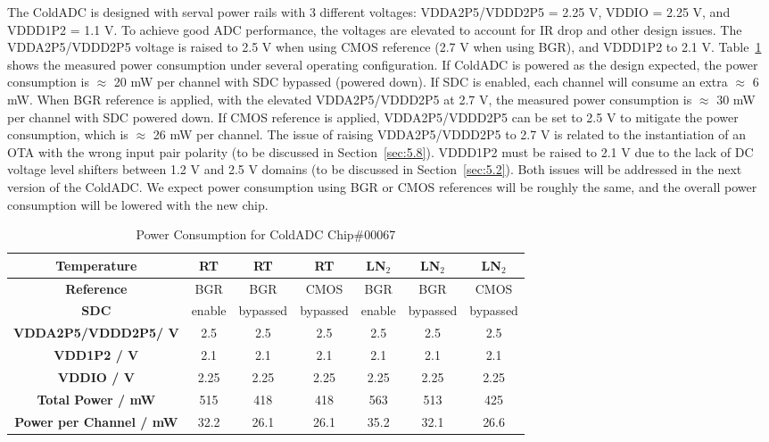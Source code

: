\label{sec:4.5}


The ColdADC is designed with serval power rails with 3 different voltages: VDDA2P5/VDDD2P5 = 2.25 V, VDDIO = 2.25 V, 
and VDDD1P2 = 1.1 V. To achieve good ADC performance, the voltages are elevated to account for IR drop and other
design issues. The  VDDA2P5/VDDD2P5 voltage is raised to 2.5 V when using CMOS reference (2.7 V when using BGR), and 
VDDD1P2 to 2.1 V.
Table~\ref{tab:powerconsumed} shows the measured power consumption under several operating configuration. If ColdADC is powered as 
the design expected, the power consumption is $\approx$ 20 mW per channel with SDC  bypassed (powered down).  If SDC is enabled, 
each channel will consume an extra $\approx$ 6 mW.  When BGR reference is applied, with the elevated VDDA2P5/VDDD2P5 at 2.7 V, the measured
power consumption is $\approx$ 30 mW per channel with SDC powered down.  If CMOS reference is applied, VDDA2P5/VDDD2P5 can be set to 
2.5 V to mitigate the power consumption, which is $\approx$ 26 mW per channel. The issue of raising VDDA2P5/VDDD2P5 to 2.7 V is 
related to the instantiation of an OTA with the wrong input pair polarity (to be discussed in Section~\ref{sec:5.8}).  VDDD1P2 must 
be raised to 2.1 V due to the lack of DC voltage level shifters between 1.2 V and 2.5 V domains (to be discussed in Section~\ref{sec:5.2}). 
Both issues will be addressed in the next version of the ColdADC. We expect power consumption using 
BGR or CMOS references will be roughly the same, and the overall power consumption will be lowered with the new chip.
\begin{table}[h]
\centering
\begin{tabular}{|c|c|c|c|c|c|c|}
\hline
\textbf{Temperature} & RT & RT & RT & LN$_2$ & LN$_2$ & LN$_2$ \\ \hline
\textbf{Reference} & BGR & BGR & CMOS & BGR & BGR & CMOS \\ \hline
\textbf{SDC} & enable & bypassed & bypassed & enable & bypassed & bypassed \\ \hline
\textbf{VDDA2P5/VDDD2P5/ V} & 2.5 &2.5 &2.5 &2.5 &2.5 &2.5 \\ \hline
\textbf{VDD1P2 / V} & 2.1 & 2.1 & 2.1 & 2.1 & 2.1 & 2.1 \\ \hline
\textbf{VDDIO / V} & 2.25 & 2.25 & 2.25 & 2.25 & 2.25 & 2.25  \\ \hline
\textbf{Total Power / mW} & 515 & 418 & 418 & 563 & 513 & 425 \\ \hline
\textbf{Power per Channel / mW} & 32.2 & 26.1 & 26.1 & 35.2 & 32.1 & 26.6 \\ \hline
\end{tabular}
\caption{Power Consumption for ColdADC Chip\#00067}
\label{tab:powerconsumed}
\end{table}  

